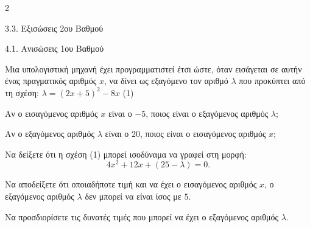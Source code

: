 \begin{ylh}{2}
    \item 3.3. Εξισώσεις 2ου Βαθμού
    \item 4.1. Ανισώσεις 1ου Βαθμού
\end{ylh}
Μια υπολογιστική μηχανή έχει προγραμματιστεί έτσι ώστε, όταν εισάγεται σε αυτήν ένας πραγματικός αριθμός $x$, να δίνει ως εξαγόμενο τον αριθμό $\lambda$ που προκύπτει από τη σχέση: $\lambda = (2x + 5)^{2} - 8x$ (1)
\begin{alist}
\item Αν ο εισαγόμενος αριθμός $x$ είναι ο $- 5$, ποιος είναι ο εξαγόμενος αριθμός $\lambda$;
\item Αν ο εξαγόμενος αριθμός $\lambda$ είναι ο $20$, ποιος είναι ο εισαγόμενος αριθμός $x$;
\item
\begin{rlist}
\item
  Να δείξετε ότι η σχέση (1) μπορεί ισοδύναμα να γραφεί στη μορφή:
\begin{equation*}4x^{2} + 12x + (25 - \lambda) = 0.\end{equation*}
\item
  Να αποδείξετε ότι οποιαδήποτε τιμή και να έχει ο εισαγόμενος αριθμός $x$, ο εξαγόμενος αριθμός $\lambda$ δεν μπορεί να είναι ίσος με $5$.
\item
  Να προσδιορίσετε τις δυνατές τιμές που μπορεί να έχει ο εξαγόμενος αριθμός $\lambda$.
\end{rlist}
\end{alist}

